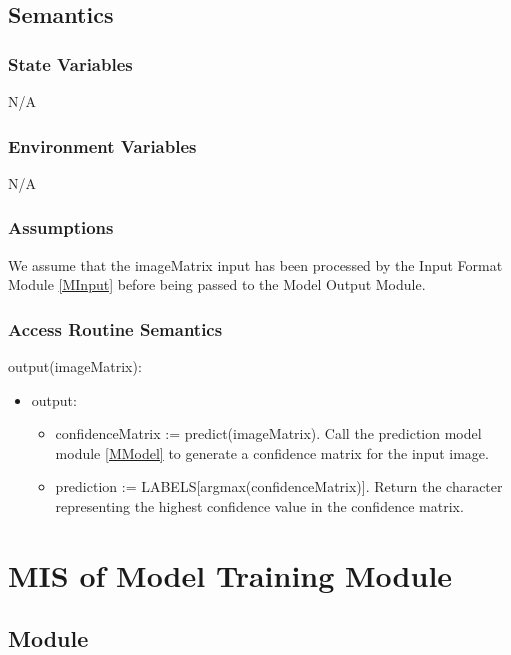 \documentclass[12pt, titlepage]{article}
\begin{document}
\subsection{Semantics}

\subsubsection{State Variables}

N/A

\subsubsection{Environment Variables}

N/A

\subsubsection{Assumptions}

We assume that the imageMatrix input has been processed by the Input Format
Module \ref{MInput} before being passed to the Model Output Module.

\subsubsection{Access Routine Semantics}

\noindent output(imageMatrix):
\begin{itemize}
\item output:
\begin{itemize}
  \item confidenceMatrix := predict(imageMatrix). Call the prediction model
  module \ref{MModel} to generate a confidence matrix for the input image.
  \item prediction := LABELS[argmax(confidenceMatrix)]. Return the character
  representing the highest confidence value in the confidence matrix.
\end{itemize}
\end{itemize}

\section{MIS of Model Training Module} \label{MTraining}

\subsection{Module}
\end{document}
